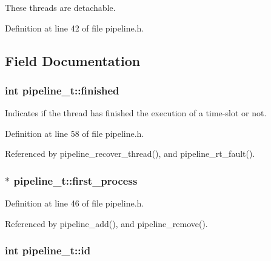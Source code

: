 These threads are detachable. 

Definition at line 42 of file pipeline.\-h.



\subsection{Field Documentation}
\hypertarget{structpipeline__t_a676e2ef00113a6da513d70007858628b}{
\subsubsection[{finished}]{\setlength{\rightskip}{0pt plus 5cm}int pipeline\-\_\-t\-::finished}}\label{structpipeline__t_a676e2ef00113a6da513d70007858628b}
Indicates if the thread has finished the execution of a time-\/slot or not. 

Definition at line 58 of file pipeline.\-h.



Referenced by pipeline\-\_\-recover\-\_\-thread(), and pipeline\-\_\-rt\-\_\-fault().

\hypertarget{structpipeline__t_a6bb54a0cd8dde618972cdcd629503979}{
\subsubsection[{first\-\_\-process}]{$\ast$ pipeline\-\_\-t\-::first\-\_\-process}}\label{structpipeline__t_a6bb54a0cd8dde618972cdcd629503979}


Definition at line 46 of file pipeline.\-h.



Referenced by pipeline\-\_\-add(), and pipeline\-\_\-remove().

\hypertarget{structpipeline__t_a4d67080f7085c575d347d1ed5203a2ff}{
\subsubsection[{id}]{\setlength{\rightskip}{0pt plus 5cm}int pipeline\-\_\-t\-::id}}\label{structpipeline__t_a4d67080f7085c575d347d1ed5203a2ff}


